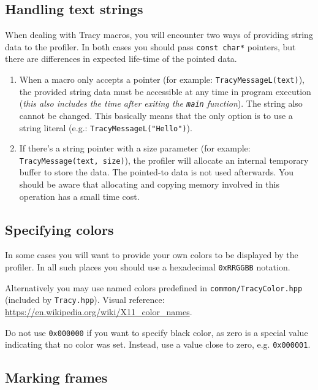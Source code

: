 \documentclass[hidelinks,titlepage,a4paper]{article}
\begin{document}
\subsection{Handling text strings}

When dealing with Tracy macros, you will encounter two ways of providing string data to the profiler. In both cases you should pass \texttt{const char*} pointers, but there are differences in expected life-time of the pointed data.

\begin{enumerate}
\item When a macro only accepts a pointer (for example: \texttt{TracyMessageL(text)}), the provided string data must be accessible at any time in program execution (\emph{this also includes the time after exiting the \texttt{main} function}). The string also cannot be changed. This basically means that the only option is to use a string literal (e.g.: \texttt{TracyMessageL("Hello")}).

\item If there's a string pointer with a size parameter (for example: \texttt{TracyMessage(text, size)}), the profiler will allocate an internal temporary buffer to store the data. The pointed-to data is not used afterwards. You should be aware that allocating and copying memory involved in this operation has a small time cost.
\end{enumerate}

\subsection{Specifying colors}

In some cases you will want to provide your own colors to be displayed by the profiler. In all such places you should use a hexadecimal \texttt{0xRRGGBB} notation.

Alternatively you may use named colors predefined in \texttt{common/TracyColor.hpp} (included by \texttt{Tracy.hpp}). Visual reference: \url{https://en.wikipedia.org/wiki/X11_color_names}.

Do not use \texttt{0x000000} if you want to specify black color, as zero is a special value indicating that no color was set. Instead, use a value close to zero, e.g. \texttt{0x000001}.

\subsection{Marking frames}
\label{markingframes}
\end{document}
